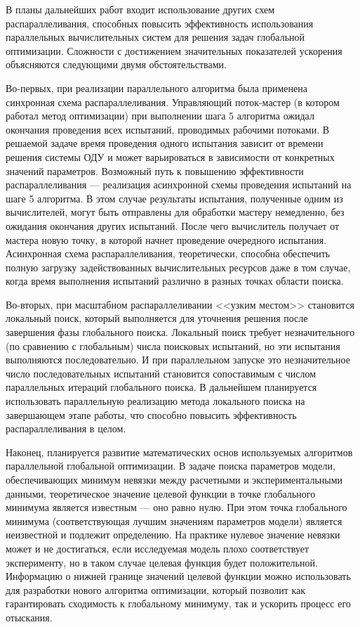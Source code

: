 \documentclass{cmi1}
\begin{document}
В планы дальнейших работ входит использование других схем распараллеливания, способных повысить эффективность использования параллельных вычислительных систем для решения задач глобальной оптимизации. Сложности с достижением значительных показателей ускорения объясняются следующими двумя обстоятельствами. 

Во-первых, при реализации параллельного алгоритма была применена синхронная схема распараллеливания. Управляющий поток-мастер (в котором работал метод оптимизации) при выполнении  шага 5 алгоритма ожидал окончания проведения всех испытаний, проводимых рабочими потоками. В решаемой задаче время проведения одного испытания зависит от времени решения системы ОДУ и может варьироваться в зависимости от конкретных значений параметров. Возможный путь к повышению эффективности распараллеливания --- реализация асинхронной схемы проведения испытаний на шаге 5 алгоритма. В этом случае результаты испытания, полученные одним из вычислителей, могут быть отправлены для обработки мастеру немедленно, без ожидания окончания других испытаний. После чего вычислитель получает от мастера новую точку, в которой начнет проведение очередного испытания. Асинхронная схема распараллеливания, теоретически, способна обеспечить полную загрузку задействованных вычислительных ресурсов даже в том случае, когда время выполнения испытаний различно в разных точках области поиска.
 
Во-вторых, при масштабном распараллеливании <<узким местом>> становится локальный поиск, который выполняется для уточнения решения после завершения фазы глобального поиска. Локальный поиск требует незначительного (по сравнению с глобальным) числа поисковых испытаний, но эти испытания выполняются последовательно. И при параллельном запуске это незначительное число последовательных испытаний становится сопоставимым с числом параллельных итераций глобального поиска. В дальнейшем планируется использовать параллельную реализацию метода локального поиска на завершающем этапе работы, что способно повысить эффективность распараллеливания в целом.

Наконец, планируется развитие математических основ используемых алгоритмов параллельной глобальной оптимизации. 
В задаче поиска параметров модели, обеспечивающих минимум невязки между расчетными и экспериментальными данными, теоретическое значение целевой функции в точке глобального минимума является известным --- оно равно нулю.
При этом точка глобального минимума (соответствующая лучшим значениям параметров модели) является неизвестной и подлежит определению.
На практике нулевое значение невязки может и не достигаться, если исследуемая модель плохо соответствует эксперименту, но в таком случае целевая функция будет положительной.  
Информацию о нижней границе значений целевой функции можно использовать для разработки нового алгоритма оптимизации, который позволит как гарантировать сходимость к глобальному минимуму, так и ускорить процесс его отыскания.
\end{document}
